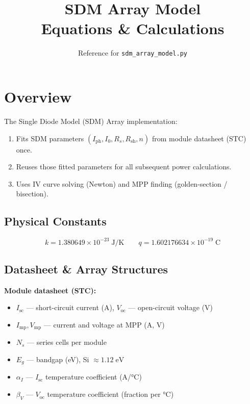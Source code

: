 \documentclass[11pt,a4paper]{article}
\title{SDM Array Model\\Equations \& Calculations}
\author{Reference for \texttt{sdm\_array\_model.py}}
\date{}
\begin{document}
\maketitle
\tableofcontents
\newpage

\section{Overview}

The Single Diode Model (SDM) Array implementation:
\begin{enumerate}
  \item Fits SDM parameters \((I_{\mathrm{ph}}, I_0, R_s, R_{\mathrm{sh}}, n)\) from module datasheet (STC) once.
  \item Reuses those fitted parameters for all subsequent power calculations.
  \item Uses IV curve solving (Newton) and MPP finding (golden-section / bisection).
\end{enumerate}

\subsection{Physical Constants}

\begin{equation}
  k = 1.380649\times10^{-23}\;\mathrm{J/K} \qquad
  q = 1.602176634\times10^{-19}\;\mathrm{C}
\end{equation}

\subsection{Datasheet \& Array Structures}

\textbf{Module datasheet (STC):}
\begin{itemize}
  \item \(I_{\mathrm{sc}}\) — short-circuit current (A), \(V_{\mathrm{oc}}\) — open-circuit voltage (V)
  \item \(I_{\mathrm{mp}}, V_{\mathrm{mp}}\) — current and voltage at MPP (A, V)
  \item \(N_s\) — series cells per module
  \item \(E_g\) — bandgap (eV), Si \(\approx 1.12\;\mathrm{eV}\)
  \item \(\alpha_I\) — \(I_{\mathrm{sc}}\) temperature coefficient (A/°C)
  \item \(\beta_V\) — \(V_{\mathrm{oc}}\) temperature coefficient (fraction per °C)
\end{itemize}
\end{document}
